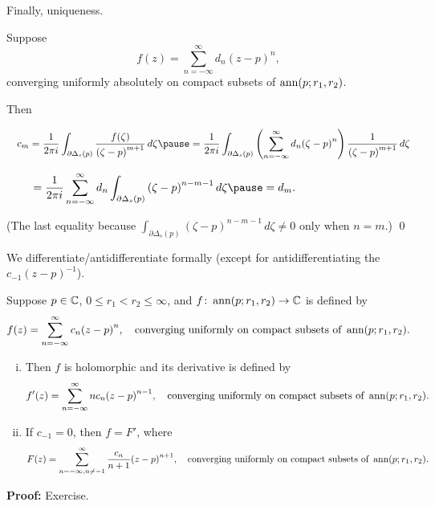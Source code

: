 \documentclass[10pt,aspectratio=169]{beamer}
\begin{document}
\begin{frame}
Finally, uniqueness.

\medskip
\pause
Suppose
\[
f(z)
=
\sum_{n=-\infty}^{\infty} d_n {(z-p)}^{n} ,
\]
converging uniformly absolutely on compact subsets of $\operatorname{ann}(p;r_1,r_2)$.

\medskip
\pause

Then

\medskip
\pause

$\displaystyle
\quad
c_m
= \frac{1}{2\pi i}
\int_{\partial \Delta_{s}(p)} \frac{f(\zeta)}{{(\zeta-p)}^{m+1}}
 \, d\zeta 
\pause
=
\frac{1}{2\pi i}
\int_{\partial \Delta_{s}(p)}
\left(\sum_{n=-\infty}^{\infty} d_n {(\zeta-p)}^{n} \right)
\frac{1}{{(\zeta-p)}^{m+1}}
 \, d\zeta 
$
\medskip
\pause

$\displaystyle
\quad \quad \,\,
=
\frac{1}{2\pi i}
\sum_{n=-\infty}^{\infty}
d_n
\int_{\partial \Delta_{s}(p)}
{(\zeta-p)}^{n-m-1}
 \, d\zeta 
\pause
=
d_m .
$

\medskip

(The last equality because
$\int_{\partial \Delta_{s}(p)}
{(\zeta-p)}^{n-m-1}
 \, d\zeta \not= 0$ only when $n=m$.)
\qed
\end{frame}

\begin{frame}
We differentiate/antidifferentiate formally
(except for antidifferentiating the $c_{-1}{(z-p)}^{-1}$).

\pause

\begin{proposition}
Suppose $p \in {\mathbb{C}}$, $0 \leq r_1 < r_2 \leq \infty$, and
$f \colon \operatorname{ann}(p;r_1,r_2) \to {\mathbb{C}}$ is defined by
\[
f(z) = \sum_{n=-\infty}^\infty c_n {(z-p)}^n ,
\quad
\text{converging uniformly on compact subsets of } \operatorname{ann}(p;r_1,r_2).
\]
\begin{enumerate}[(i)]
\item
\pause
Then
$f$ is holomorphic and its 
derivative is defined by
\[
f'(z) = \sum_{n=-\infty}^\infty n c_n {(z-p)}^{n-1} ,
\quad
\text{converging uniformly on compact subsets of } \operatorname{ann}(p;r_1,r_2).
\]
\item
\pause
If $c_{-1} = 0$, then $f = F'$, where
\[
F(z) = \sum_{n=-\infty,n\not=-1}^\infty \frac{c_n}{n+1} {(z-p)}^{n+1},
\quad
\text{converging uniformly on compact subsets of } \operatorname{ann}(p;r_1,r_2).
\]
\end{enumerate}
\end{proposition}

\pause

\textbf{Proof:} Exercise.
\end{frame}
\end{document}
